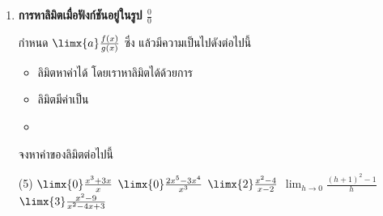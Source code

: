 \begin{enumerate}
จงระบุว่าลิมิตต่อไปนี้เป็นลิมิตประเภทใด พร้อมหาค่าด้วยการวาดกราฟหรือสร้างตารางแทนค่า
\begin{tasks}[after-item-skip = 60pt, after-skip=60pt](4)
\task $\limx{0^-} \frac{1}{x^2}$
\task $\limx{0^+} \frac{1}{x^2}$
\task $\limx{\infty} \frac{1}{x^2} $
\task $\limx{-\infty} \frac{1}{x^2} $
\end{tasks}

\item \textbf{การหาลิมิตเมื่อฟังก์ชันอยู่ในรูป $\frac{0}{0}$}

กำหนด $\limx{a} \frac{f(x)}{g(x)}$ ซึ่ง \blank แล้วมีความเป็นไปดังต่อไปนี้
\begin{itemize}
\item ลิมิตหาค่าได้ โดยเราหาลิมิตได้ด้วยการ \blank
\item ลิมิตมีค่าเป็น \blank
\item \blank
\end{itemize}

จงหาค่าของลิมิตต่อไปนี้
\begin{tasks}[after-item-skip = 100pt, after-skip = 100pt](5)
\task $\limx{0} \frac{x^3+3x}{x}$
\task $\limx{0} \frac{2x^5 - 3x^4}{x^3}$
\task $\limx{2} \frac{x^2-4}{x-2}$
\task $\lim_{h \to 0} \frac{(h+1)^2-1}{h}$
\task $\limx{3} \frac{x^2-9}{x^2-4x+3}$
\end{tasks}

\end{enumerate}
